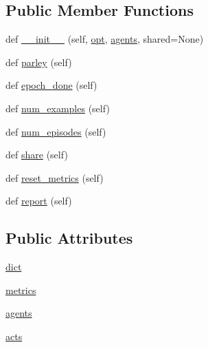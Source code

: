 \subsection*{Public Member Functions}
\begin{DoxyCompactItemize}
\item 
def \hyperlink{classparlai_1_1scripts_1_1eval__ppl_1_1PerplexityWorld_a28918c916f0ee900c655359388411f84}{\+\_\+\+\_\+init\+\_\+\+\_\+} (self, \hyperlink{classparlai_1_1core_1_1worlds_1_1World_a3640d92718acd3e6942a28c1ab3678bd}{opt}, \hyperlink{classparlai_1_1scripts_1_1eval__ppl_1_1PerplexityWorld_ad1145d0be0d157d7cbfee7664cf1dd48}{agents}, shared=None)
\item 
def \hyperlink{classparlai_1_1scripts_1_1eval__ppl_1_1PerplexityWorld_a9040f1a4e0d541a36970ca7c73f5591b}{parley} (self)
\item 
def \hyperlink{classparlai_1_1scripts_1_1eval__ppl_1_1PerplexityWorld_a6308290f51351f01a0457b586d552a1c}{epoch\+\_\+done} (self)
\item 
def \hyperlink{classparlai_1_1scripts_1_1eval__ppl_1_1PerplexityWorld_a13673a4d9cb9a57fbc219336bea1f510}{num\+\_\+examples} (self)
\item 
def \hyperlink{classparlai_1_1scripts_1_1eval__ppl_1_1PerplexityWorld_aed2ab6313608418defd2b167c1893e96}{num\+\_\+episodes} (self)
\item 
def \hyperlink{classparlai_1_1scripts_1_1eval__ppl_1_1PerplexityWorld_a2326b854872d6df841070d9d8076a9ff}{share} (self)
\item 
def \hyperlink{classparlai_1_1scripts_1_1eval__ppl_1_1PerplexityWorld_a568271c275fbe3f911c1e437a04655cf}{reset\+\_\+metrics} (self)
\item 
def \hyperlink{classparlai_1_1scripts_1_1eval__ppl_1_1PerplexityWorld_ae3b38df8869d22000b5bb570de883c1f}{report} (self)
\end{DoxyCompactItemize}
\subsection*{Public Attributes}
\begin{DoxyCompactItemize}
\item 
\hyperlink{classparlai_1_1scripts_1_1eval__ppl_1_1PerplexityWorld_aef6a413e96d7276e3d39acad0f543a95}{dict}
\item 
\hyperlink{classparlai_1_1scripts_1_1eval__ppl_1_1PerplexityWorld_a22875b8c503fb611cb253c69f88a2a31}{metrics}
\item 
\hyperlink{classparlai_1_1scripts_1_1eval__ppl_1_1PerplexityWorld_ad1145d0be0d157d7cbfee7664cf1dd48}{agents}
\item 
\hyperlink{classparlai_1_1scripts_1_1eval__ppl_1_1PerplexityWorld_a6dc6a22aeefb747f50fd2f861667b1f3}{acts}
\end{DoxyCompactItemize}


